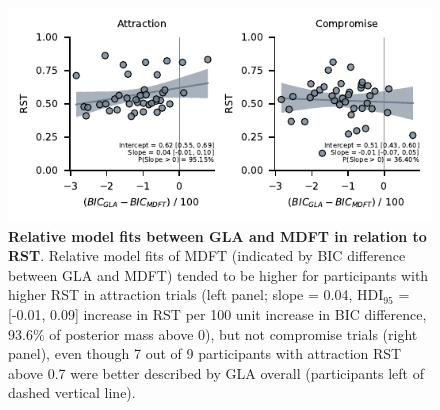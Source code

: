 \documentclass[11pt, a4paper]{article}
\begin{document}
\begin{refsection}
\begin{figure}[ht!]
\begin{centering}
\includegraphics[scale=1]{../figures/S_GLA-vs-MDFT_dBIC_RST.pdf}
\caption{\textbf{Relative model fits between GLA and MDFT in relation to RST}. Relative model fits of MDFT (indicated by BIC difference between GLA and MDFT) tended to be higher for participants with higher RST in attraction trials (left panel; slope = 0.04, HDI$_{95}$ = [-0.01, 0.09] increase in RST per 100 unit increase in BIC difference, 93.6\% of posterior mass above 0), but not compromise trials (right panel), even though 7 out of 9 participants with attraction RST above 0.7 were better described by GLA overall (participants left of dashed vertical line).}
\label{fig:dbic-rst}
\end{centering}
\end{figure}
\clearpage

\begin{landscape}
\begin{table}[ht]

\end{table}
\end{landscape}
\end{refsection}
\end{document}
